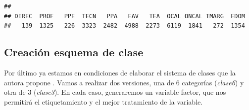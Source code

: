 \documentclass[
]{book}
\newenvironment{Shaded}{\begin{snugshade}}{\end{snugshade}}
\newcommand{\AttributeTok}[1]{\textcolor[rgb]{0.77,0.63,0.00}{#1}}
\newcommand{\FunctionTok}[1]{\textcolor[rgb]{0.00,0.00,0.00}{#1}}
\newcommand{\NormalTok}[1]{#1}
\newcommand{\OtherTok}[1]{\textcolor[rgb]{0.56,0.35,0.01}{#1}}
\newcommand{\SpecialCharTok}[1]{\textcolor[rgb]{0.00,0.00,0.00}{#1}}
\newcommand{\StringTok}[1]{\textcolor[rgb]{0.31,0.60,0.02}{#1}}
\begin{document}
\begin{Shaded}
\end{Shaded}

\begin{verbatim}
## 
## DIREC  PROF   PPE  TECN   PPA   EAV   TEA  OCAL ONCAL TMARG  EDOM 
##   139  1325   226  3323  2482  4988  2273  6119  1841   272  1354
\end{verbatim}

\hypertarget{creaciuxf3n-esquema-de-clase}{%
\subsection{Creación esquema de clase}\label{creaciuxf3n-esquema-de-clase}}

Por último ya estamos en condiciones de elaborar el sistema de clases que la autora propone \citep[pp.~235]{Torrado1998d}. Vamos a realizar dos versiones, una de 6 categorías (\emph{clase6}) y otra de 3 (\emph{clase3}). En cada caso, generaremos un variable factor, que nos permitirá el etiquetamiento y el mejor tratamiento de la variable.
\end{document}
